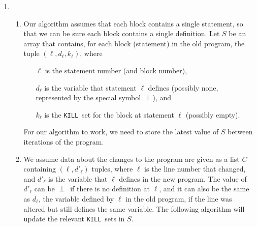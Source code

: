 \documentclass{article}
\begin{document}
\begin{enumerate}
\begin{enumerate}
    \end{enumerate}

  \item
    \newcommand\bottom{\ensuremath{\perp}}
    \newcommand\union{\bigcup}
    \newcommand\Kill{\texttt{KILL}}
    \newcommand\Gen{\texttt{GEN}}
    \begin{enumerate}
      \item Our algorithm assumes that each block contains a single
        statement, so that we can be sure each block contains a single
        definition. Let $S$ be an array that contains, for each block
        (statement) in the old program, the tuple $(\ell, d_\ell,
        k_\ell)$, where
        \begin{itemize}
          \item[$\ell$] is the statement number (and block number),
          \item[$d_\ell$]is the variable that statement $\ell$ defines
            (possibly none, represented by the special symbol
            \bottom), and
          \item[$k_\ell$] is the \Kill\ set for the block at statement
            $\ell$ (possibly empty).
        \end{itemize}
        For our algorithm to work, we need to store the latest value
        of $S$ between iterations of the program.
      \item We assume data about the changes to the program are given
        as a list $C$ containing $(\ell, d'_\ell)$ tuples, where
        $\ell$ is the line number that changed, and $d'_\ell$ is the
        variable that $\ell$ defines in the new program. The value of
        $d'_\ell$ can be \bottom\ if there is no definition at $\ell$,
        and it can also be the same as $d_\ell$, the variable defined
        by $\ell$ in the old program, if the line was altered but
        still defines the same variable. The following algorithm will
        update the relevant \Kill\ sets in $S$.


\end{enumerate}
\end{enumerate}
\end{document}
